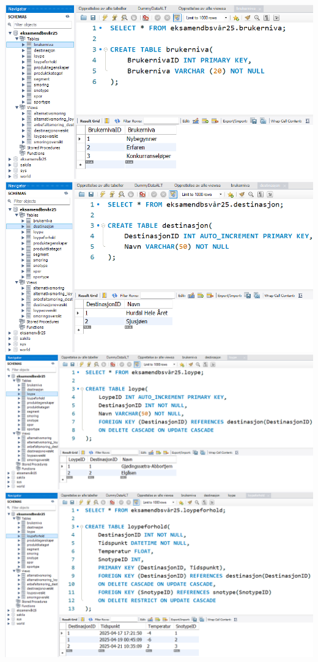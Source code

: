 \documentclass[10pt, a4paper]{article}
\begin{document}
\includegraphics[width=\textwidth]{brukerniva.png}
\includegraphics[width=\textwidth]{destinasjon.png}
\includegraphics[width=\textwidth]{loype.png}
\includegraphics[width=\textwidth]{loypeforhold.png}
\end{document}

